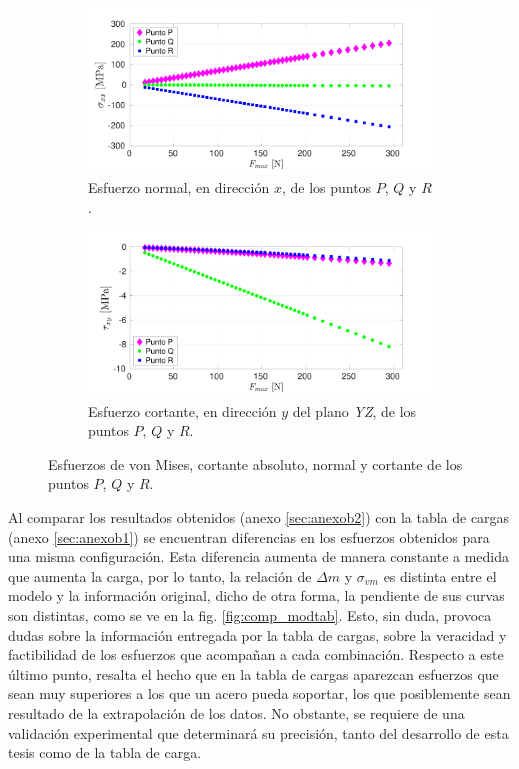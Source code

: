 \begin{figure}[p]
\centering
	\ContinuedFloat
	\begin{subfigure}{1\linewidth}
		\centering
		\includegraphics[width=\linewidth, trim={0cm 0cm 2cm 0cm},clip]{Imagenes/esf_normal.pdf}
		\caption{Esfuerzo normal, en dirección $x$, de los puntos $P$, $Q$ y $R$.}
		\label{fig:esf_normal201}
	\end{subfigure}
	\begin{subfigure}{1\linewidth}
		\centering
		\includegraphics[width=\linewidth, trim={1cm 0cm 2cm 0cm},clip]{Imagenes/esf_cortante.pdf}
		\caption{Esfuerzo cortante, en dirección $y$ del plano \textit{YZ}, de los puntos $P$, $Q$ y $R$.}
		\label{fig:esf_ms201}
	\end{subfigure}
\caption{Esfuerzos de von Mises, cortante absoluto, normal y cortante de los puntos $P$, $Q$ y $R$.}
\label{fig:esf_201}
\end{figure}

\newpage

Al comparar los resultados obtenidos (anexo \ref{sec:anexob2}) con la tabla de cargas (anexo \ref{sec:anexob1}) se encuentran diferencias en los esfuerzos obtenidos para una misma configuración. Esta diferencia aumenta de manera constante a medida que aumenta la carga, por lo tanto, la relación de $\Delta m$ y $\sigma_{vm}$ es distinta entre el modelo y la información original, dicho de otra forma, la pendiente de sus curvas son distintas, como se ve en la fig. \ref{fig:comp_modtab}. Esto, sin duda, provoca dudas sobre la información entregada por la tabla de cargas, sobre la veracidad y factibilidad de los esfuerzos que acompañan a cada combinación. Respecto a este último punto, resalta el hecho que en la tabla de cargas aparezcan esfuerzos que sean muy superiores a los que un acero pueda soportar, los que posiblemente sean resultado de la extrapolación de los datos. No obstante, se requiere de una validación experimental que determinará su precisión, tanto del desarrollo de esta tesis como de la tabla de carga.

